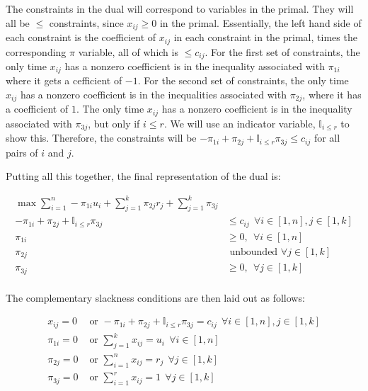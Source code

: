 \documentclass[fleqn]{homework}
\begin{document}
\begin{problem}{4}
    The constraints in the dual will correspond to variables in the primal.
    They will all be $\le$ constraints, since $x_{ij} \ge 0$ in the primal.
    Essentially, the left hand side of each constraint is the coefficient of
    $x_{ij}$ in each constraint in the primal, times the corresponding $\pi$
    variable, all of which is $\le c_{ij}$.  For the first set of constraints,
    the only time $x_{ij}$ has a nonzero coefficient is in the inequality
    associated with $\pi_{1i}$ where it gets a cefficient of $-1$.  For the
    second set of constraints, the only time $x_{ij}$ has a nonzero coefficient
    is in the inequalities associated with $\pi_{2j}$, where it has a
    coefficient of $1$.  The only time $x_{ij}$ has a nonzero coefficient is in
    the inequality associated with $\pi_{3j}$, but only if $i \le r$.  We will
    use an indicator variable, $\mathbb{I}_{i\le r}$ to show this. Therefore,
    the constraints will be
    $-\pi_{1i} + \pi_{2j} + \mathbb{I}_{i\le r}\pi_{3j} \le c_{ij}$ for all
    pairs of $i$ and $j$.

    Putting all this together, the final representation of the dual is:

    \begin{align*}
      \max \sum_{i=1}^n -\pi_{1i} u_i + \sum_{j=1}^k \pi_{2j} r_j + \sum_{j=1}^k
    \pi_{3j} &\\
      -\pi_{1i} + \pi_{2j} + \mathbb{I}_{i \le r}\pi_{3j} &\le c_{ij} \:\: \forall i \in [1, n], j \in [1, k] \\
      \pi_{1i} &\ge 0, \:\: \forall i \in [1, n] \\
      \pi_{2j} &\text{ unbounded } \forall j \in [1, k] \\
      \pi_{3j} &\ge 0, \:\: \forall j \in [1, k] \\
    \end{align*}

    The complementary slackness conditions are then laid out as follows:

    \begin{align*}
      x_{ij} = 0 &\text{ or } -\pi_{1i} + \pi_{2j} + \mathbb{I}_{i\le r}\pi_{3j} = c_{ij} \:\: \forall i \in [1,n], j \in [1, k] \\
      \pi_{1i} = 0 &\text{ or } \sum_{j=1}^k x_{ij} = u_{i} \:\: \forall i \in [1,n] \\
      \pi_{2j} = 0 &\text{ or } \sum_{i=1}^n x_{ij} = r_j \:\: \forall j \in [1,k] \\
      \pi_{3j} = 0 &\text{ or } \sum_{i=1}^r x_{ij} = 1 \:\: \forall j \in [1,k]
    \end{align*}
  \end{problem}
\end{document}
